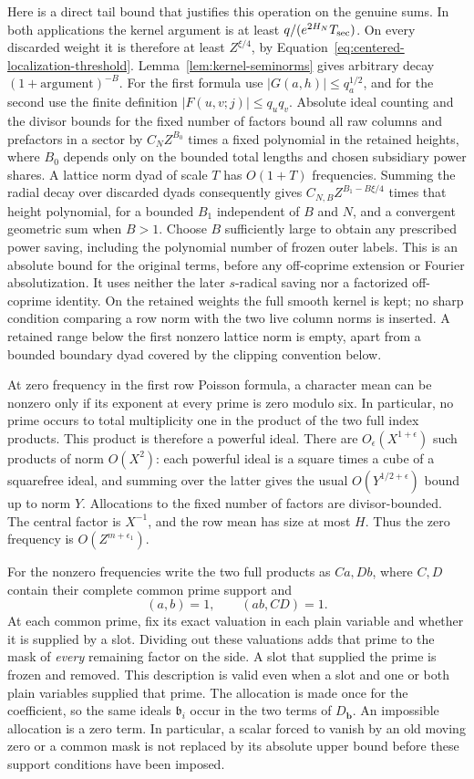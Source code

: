 \documentclass[11pt,a4paper]{article}
\numberwithin{equation}{section}
\numberwithin{figure}{section}
\theoremstyle{definition}
\theoremstyle{remark}
\begin{document}
Here is a direct tail bound that justifies this operation on the
genuine sums.  In both applications the kernel argument is at least
\(q/(e^{2H_N}T_{\rm sec})\).  On every discarded weight it is
therefore at least \(Z^{\xi/4}\), by
Equation~\eqref{eq:centered-localization-threshold}.
Lemma~\ref{lem:kernel-seminorms} gives arbitrary decay
\((1+\text{argument})^{-B}\).  For the first formula use
\(|G(a,h)|\le q_a^{1/2}\), and for the second use the finite
definition \(|F(u,v;j)|\le q_uq_v\).  Absolute ideal counting and
the divisor bounds for the fixed number of factors bound all raw
columns and prefactors in a sector by \(C_NZ^{B_0}\) times a fixed
polynomial in the retained heights, where \(B_0\) depends only on
the bounded total lengths and chosen subsidiary power shares.  A
lattice norm dyad of scale \(T\) has \(O(1+T)\) frequencies.
Summing the radial decay over discarded dyads consequently gives
\(C_{N,B}Z^{B_1-B\xi/4}\) times that height polynomial, for a
bounded \(B_1\) independent of \(B\) and \(N\), and a convergent
geometric sum when \(B>1\).
Choose \(B\) sufficiently large to obtain any prescribed power
saving, including the polynomial number of frozen outer labels.
This is an absolute bound for the original terms, before any
off-coprime extension or Fourier absolutization.  It uses neither
the later \(s\)-radical saving nor a factorized off-coprime identity.
On the retained weights the full smooth kernel is kept; no sharp
condition comparing a row norm with the two live column norms is
inserted.  A retained range below the first nonzero lattice norm is
empty, apart from a bounded boundary dyad covered by the clipping
convention below.

At zero frequency in the first row Poisson formula, a character mean
can be nonzero only if its exponent at every prime is zero modulo
six.  In particular, no prime occurs to total multiplicity one in
the product of the two full index products.  This product is
therefore a powerful ideal.  There are \(O_\epsilon(X^{1+\epsilon})\)
such products of norm \(O(X^2)\): each powerful ideal is a square
times a cube of a squarefree ideal, and summing over the latter gives
the usual \(O(Y^{1/2+\epsilon})\) bound up to norm \(Y\).
Allocations to the fixed number of factors are divisor-bounded.
The central factor is \(X^{-1}\), and the row mean has size at most
\(H\).  Thus the zero frequency is \(O(Z^{m+\epsilon_1})\).

For the nonzero frequencies write the two full products as \(Ca,Db\),
where \(C,D\) contain their complete common prime support and
\[
 (a,b)=1,\qquad (ab,CD)=1.
\]
At each common prime, fix its exact
valuation in each plain variable and whether it is supplied by a
slot.  Dividing out these valuations adds that prime to the mask of
\emph{every} remaining factor on the side.  A slot that supplied the
prime is frozen and removed.  This description is valid even when a
slot and one or both plain variables supplied that prime.  The
allocation is made once for the coefficient, so the same ideals
\(\mathfrak b_i\) occur in the two terms of \(D_{\mathbf b}\).
An impossible allocation is a zero term.  In particular, a scalar
forced to vanish by an old moving zero or a common mask is not
replaced by its absolute upper bound before these support conditions
have been imposed.
\end{document}
